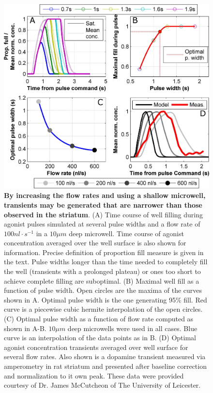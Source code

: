   \begin{figure}[!htb]
       \centering
       \includegraphics[width=13.17cm]{chapter6/figures/imporvedTimeScales/FlowRateDeterminedTimeScales.jpg}
       \caption[Shortening of the agonist transient time scales by changing the microfluidic parameters]{\textbf{By increasing the flow rates and using a shallow microwell, transients may be generated that are narrower than those observed in the striatum}. (A) Time course of well filling during agonist pulses simulated at several pulse widths and a flow rate of \(100 nl\cdot s^{-1}\) in a \(10 \mu m\) deep microwell. Time course of agonist concentration averaged over the well surface is also shown for information. Precise definition of proportion fill measure is given in the text. Pulse widths longer than the time needed to completely fill the well (transients with a prolonged plateau) or ones too short to achieve complete filling are suboptimal. (B) Maximal well fill as a function of pulse width. Open circles are the maxima of the curves shown in A. Optimal pulse width is the one generating 95\% fill. Red curve is a piecewise cubic hermite interpolation of the open circles. (C) Optimal pulse width as a function of flow rate computed as shown in A-B. \(10\mu m\) deep microwells were used in all cases. Blue curve is an interpolation of the data points as in B. (D) Optimal agonist concentration transients averaged over well surface for several flow rates. Also shown is a dopamine transient measured via amperometry in rat striatum and presented after baseline correction and normalization to it own peak. These data were provided courtesy of Dr. James McCutcheon of The University of Leicester.}
       \label{fig:pulses:reducedTimeScales}
  \end{figure}

